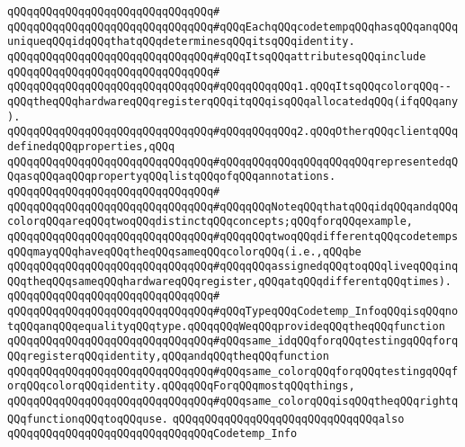 \verb|qQQqqQQqqQQqqQQqqQQqqQQqqQQqqQQq#|\newline
\verb|qQQqqQQqqQQqqQQqqQQqqQQqqQQqqQQq#qQQqEachqQQqcodetempqQQqhasqQQqanqQQquniqueqQQqidqQQqthatqQQqdeterminesqQQqitsqQQqidentity.|\newline
\verb|qQQqqQQqqQQqqQQqqQQqqQQqqQQqqQQq#qQQqItsqQQqattributesqQQqinclude|\newline
\verb|qQQqqQQqqQQqqQQqqQQqqQQqqQQqqQQq#|\newline
\verb|qQQqqQQqqQQqqQQqqQQqqQQqqQQqqQQq#qQQqqQQqqQQq1.qQQqItsqQQqcolorqQQq--qQQqtheqQQqhardwareqQQqregisterqQQqitqQQqisqQQqallocatedqQQq(ifqQQqany).|\newline
\verb|qQQqqQQqqQQqqQQqqQQqqQQqqQQqqQQq#qQQqqQQqqQQq2.qQQqOtherqQQqclientqQQqdefinedqQQqproperties,qQQq|\newline
\verb|qQQqqQQqqQQqqQQqqQQqqQQqqQQqqQQq#qQQqqQQqqQQqqQQqqQQqqQQqrepresentedqQQqasqQQqaqQQqpropertyqQQqlistqQQqofqQQqannotations.|\newline
\verb|qQQqqQQqqQQqqQQqqQQqqQQqqQQqqQQq#|\newline
\verb|qQQqqQQqqQQqqQQqqQQqqQQqqQQqqQQq#qQQqqQQqNoteqQQqthatqQQqidqQQqandqQQqcolorqQQqareqQQqtwoqQQqdistinctqQQqconcepts;qQQqforqQQqexample,|\newline
\verb|qQQqqQQqqQQqqQQqqQQqqQQqqQQqqQQq#qQQqqQQqtwoqQQqdifferentqQQqcodetempsqQQqmayqQQqhaveqQQqtheqQQqsameqQQqcolorqQQq(i.e.,qQQqbe|\newline
\verb|qQQqqQQqqQQqqQQqqQQqqQQqqQQqqQQq#qQQqqQQqassignedqQQqtoqQQqliveqQQqinqQQqtheqQQqsameqQQqhardwareqQQqregister,qQQqatqQQqdifferentqQQqtimes).|\newline
\verb|qQQqqQQqqQQqqQQqqQQqqQQqqQQqqQQq#|\newline
\verb|qQQqqQQqqQQqqQQqqQQqqQQqqQQqqQQq#qQQqTypeqQQqCodetemp_InfoqQQqisqQQqnotqQQqanqQQqequalityqQQqtype.qQQqqQQqWeqQQqprovideqQQqtheqQQqfunction|\newline
\verb|qQQqqQQqqQQqqQQqqQQqqQQqqQQqqQQq#qQQqsame_idqQQqforqQQqtestingqQQqforqQQqregisterqQQqidentity,qQQqandqQQqtheqQQqfunction|\newline
\verb|qQQqqQQqqQQqqQQqqQQqqQQqqQQqqQQq#qQQqsame_colorqQQqforqQQqtestingqQQqforqQQqcolorqQQqidentity.qQQqqQQqForqQQqmostqQQqthings,|\newline
\verb|qQQqqQQqqQQqqQQqqQQqqQQqqQQqqQQq#qQQqsame_colorqQQqisqQQqtheqQQqrightqQQqfunctionqQQqtoqQQquse.|\newline
\newline
\verb|qQQqqQQqqQQqqQQqqQQqqQQqqQQqqQQqalso|\newline
\verb|qQQqqQQqqQQqqQQqqQQqqQQqqQQqqQQqCodetemp_Info|\newline
